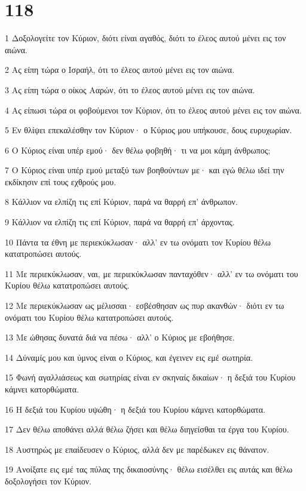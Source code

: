 \chapter{118}

\par 1 Δοξολογείτε τον Κύριον, διότι είναι αγαθός, διότι το έλεος αυτού μένει εις τον αιώνα.
\par 2 Ας είπη τώρα ο Ισραήλ, ότι το έλεος αυτού μένει εις τον αιώνα.
\par 3 Ας είπη τώρα ο οίκος Ααρών, ότι το έλεος αυτού μένει εις τον αιώνα.
\par 4 Ας είπωσι τώρα οι φοβούμενοι τον Κύριον, ότι το έλεος αυτού μένει εις τον αιώνα.
\par 5 Εν θλίψει επεκαλέσθην τον Κύριον· ο Κύριος μου υπήκουσε, δους ευρυχωρίαν.
\par 6 Ο Κύριος είναι υπέρ εμού· δεν θέλω φοβηθή· τι να μοι κάμη άνθρωπος;
\par 7 Ο Κύριος είναι υπέρ εμού μεταξύ των βοηθούντων με· και εγώ θέλω ιδεί την εκδίκησιν επί τους εχθρούς μου.
\par 8 Κάλλιον να ελπίζη τις επί Κύριον, παρά να θαρρή επ' άνθρωπον.
\par 9 Κάλλιον να ελπίζη τις επί Κύριον, παρά να θαρρή επ' άρχοντας.
\par 10 Πάντα τα έθνη με περιεκύκλωσαν· αλλ' εν τω ονόματι τον Κυρίου θέλω κατατροπώσει αυτούς.
\par 11 Με περιεκύκλωσαν, ναι, με περιεκύκλωσαν πανταχόθεν· αλλ' εν τω ονόματι του Κυρίου θέλω κατατροπώσει αυτούς.
\par 12 Με περιεκύκλωσαν ως μέλισσαι· εσβέσθησαν ως πυρ ακανθών· διότι εν τω ονόματι του Κυρίου θέλω κατατροπώσει αυτούς.
\par 13 Με ώθησας δυνατά διά να πέσω· αλλ' ο Κύριος με εβοήθησε.
\par 14 Δύναμίς μου και ύμνος είναι ο Κύριος, και έγεινεν εις εμέ σωτηρία.
\par 15 Φωνή αγαλλιάσεως και σωτηρίας είναι εν σκηναίς δικαίων· η δεξιά του Κυρίου κάμνει κατορθώματα.
\par 16 Η δεξιά του Κυρίου υψώθη· η δεξιά του Κυρίου κάμνει κατορθώματα.
\par 17 Δεν θέλω αποθάνει αλλά θέλω ζήσει και θέλω διηγείσθαι τα έργα του Κυρίου.
\par 18 Αυστηρώς με επαίδευσεν ο Κύριος, αλλά δεν με παρέδωκεν εις θάνατον.
\par 19 Ανοίξατε εις εμέ τας πύλας της δικαιοσύνης· θέλω εισέλθει εις αυτάς και θέλω δοξολογήσει τον Κύριον.
